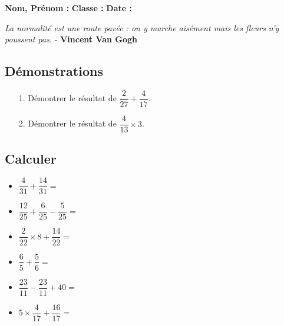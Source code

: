 \newpage

\textbf{Nom, Prénom :} \hspace{8cm} \textbf{Classe :} \hspace{3cm} \textbf{Date :}\\
\vspace{-0.8cm}
\begin{center}
  \textit{La normalité est une route pavée : on y marche aisément mais les fleurs n’y poussent pas.} - \textbf{Vincent Van Gogh}
\end{center}
\vspace{-0.8cm}

\subsection*{Démonstrations}

\begin{multicols}{2}
\begin{enumerate}
  \item[1.] Démontrer le résultat de $\dfrac{2}{27} + \dfrac{4}{17}$.  \\ \Pointilles[6] \columnbreak 
  \item[2.] Démontrer le résultat de $\dfrac{4}{13} \times 3$.  \\ \Pointilles[6]
\end{enumerate} 
\end{multicols}

\subsection*{Calculer}

\begin{itemize}[label={$\bullet$}]
\item $\dfrac{4}{31} + \dfrac{14}{31} =$ \dotfill \\
\item $\dfrac{12}{25} + \dfrac{6}{25} - \dfrac{5}{25} =$ \dotfill \\
\item $\dfrac{2}{22} \times 8 + \dfrac{14}{22} =$ \dotfill \\
\item $\dfrac{6}{5} + \dfrac{5}{6} =$ \dotfill \\
\item $\dfrac{23}{11} - \dfrac{23}{11} + 40 =$ \dotfill \\
\item $5 \times \dfrac{4}{17} + \dfrac{16}{17} =$ \dotfill \\
\end{itemize} 

